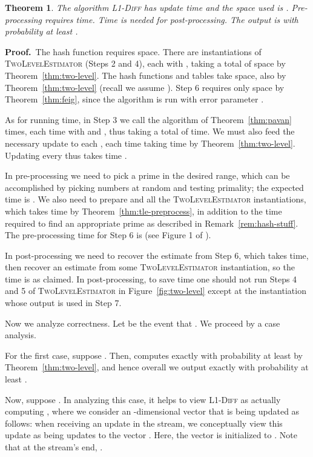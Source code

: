 \documentclass[letterpaper,11pt]{article}
\newcommand{\TheoremName}[1]{\label{thm:#1}}
\newcommand{\Remark}[1]{Remark~\ref{rem:#1}}
\newcommand{\Theorem}[1]{Theorem~\ref{thm:#1}}
\newcommand{\Figure}[1]{Figure~\ref{fig:#1}}
\newtheorem{theorem}{Theorem}\newtheorem{corollary}[theorem]{Corollary}
\newcommand{\proofbelow}{3pt}
\newcommand{\afterproof}{\hfill  \par \vspace{\proofbelow}}
\renewenvironment{proof}{\noindent\textbf{Proof.}\,}{\afterproof}
\begin{document}
\begin{theorem}\TheoremName{main-alg}
The algorithm \textsc{L1-Diff} has update time  and the space used is
.
Pre-processing requires
 time.
Time  is
needed for post-processing.
The output is  with probability at least .
\end{theorem}
\begin{proof}
The hash function  requires  space.  There are
 instantiations of \textsc{TwoLevelEstimator}
(Steps 2 and 4), each with , taking a total of
 space by
\Theorem{two-level}. The hash functions  and tables 
take  space, also by \Theorem{two-level}
(recall we assume ). Step 6 requires only
 space by \Theorem{feig}, since the algorithm is run
with error parameter .

As for running time, in Step 3 we call the algorithm of
\Theorem{pavan}  times, each time with  and
, thus taking a total of  time. We must also feed the necessary
update to each , each time taking  time by
\Theorem{two-level}.  Updating every  thus takes time
.

In pre-processing we need to pick a prime  in the desired range,
which can be accomplished by picking numbers at random and testing
primality; the expected time is . We also need to
prepare  and all the \textsc{TwoLevelEstimator}
instantiations, which takes 
time by \Theorem{tle-preprocess}, in addition to the 
time required to find an appropriate prime  as described in
\Remark{hash-stuff}. The pre-processing time for Step 6
is  (see Figure 1 of \cite{FKSV02}).

In post-processing we need to recover the estimate  from Step 6,
which takes  time, then recover an estimate from some
\textsc{TwoLevelEstimator} instantiation, so the time is as
claimed. In post-processing, to save time one should not run
Steps 4 and 5 of \textsc{TwoLevelEstimator} in \Figure{two-level}
except at the instantiation whose output is used in Step 7.

Now we analyze correctness. Let  be the event that
. We proceed by a case analysis.

For the first
case, suppose .  Then, 
computes  exactly with probability at least  by
\Theorem{two-level}, and hence overall we output  exactly with
probability at least .

Now, suppose . In analyzing this case, it helps
to view \textsc{L1-Diff} as actually computing
, where we consider an
-dimensional vector  that is being updated as follows: when
receiving an update  in the stream, we conceptually view this
update as being  updates
 to
the vector . Here, the vector  is initialized to
. Note that at the stream's end, .


\end{proof}
\end{document}
